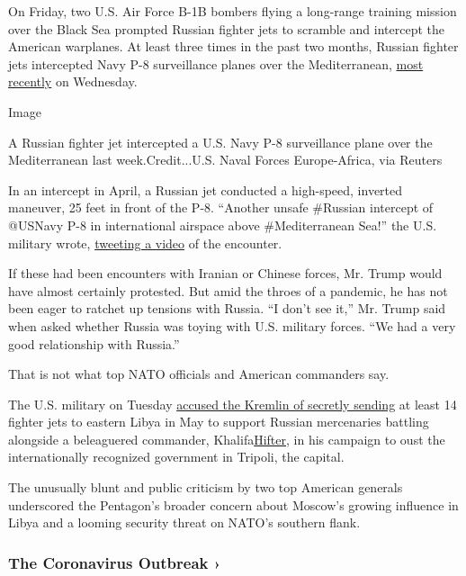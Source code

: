 On Friday, two U.S. Air Force B-1B bombers flying a long-range training
mission over the Black Sea prompted Russian fighter jets to scramble and
intercept the American warplanes. At least three times in the past two
months, Russian fighter jets intercepted Navy P-8 surveillance planes
over the Mediterranean,
\href{https://www.c6f.navy.mil/Press-Room/News/Article/2198048/unsafe-unprofessional-interception-of-a-us-navy-p-8-by-russian-su-35s-over-the/}{most
recently} on Wednesday.

Image

A Russian fighter jet intercepted a U.S. Navy P-8 surveillance plane
over the Mediterranean last week.Credit...U.S. Naval Forces
Europe-Africa, via Reuters

In an intercept in April, a Russian jet conducted a high-speed, inverted
maneuver, 25 feet in front of the P-8. ``Another unsafe \#Russian
intercept of @USNavy P-8 in international airspace above \#Mediterranean
Sea!'' the U.S. military wrote,
\href{https://www.youtube.com/watch?v=h5tk7tLbOpo}{tweeting a video} of
the encounter.

If these had been encounters with Iranian or Chinese forces, Mr. Trump
would have almost certainly protested. But amid the throes of a
pandemic, he has not been eager to ratchet up tensions with Russia. ``I
don't see it,'' Mr. Trump said when asked whether Russia was toying with
U.S. military forces. ``We had a very good relationship with Russia.''

That is not what top NATO officials and American commanders say.

The U.S. military on Tuesday
\href{https://www.nytimes.com/2020/05/26/world/middleeast/russia-warplanes-libya.html}{accused
the Kremlin of secretly sending} at least 14 fighter jets to eastern
Libya in May to support Russian mercenaries battling alongside a
beleaguered commander,
Khalifa\href{https://www.nytimes.com/2020/02/18/us/politics/hifter-torture-lawsuit-libya.html}{Hifter},
in his campaign to oust the internationally recognized government in
Tripoli, the capital.

The unusually blunt and public criticism by two top American generals
underscored the Pentagon's broader concern about Moscow's growing
influence in Libya and a looming security threat on NATO's southern
flank.

\href{https://www.nytimes.com/news-event/coronavirus?action=click\&pgtype=Article\&state=default\&region=MAIN_CONTENT_3\&context=storylines_faq}{}

\hypertarget{the-coronavirus-outbreak-}{%
\subsubsection{The Coronavirus Outbreak
›}\label{the-coronavirus-outbreak-}}

